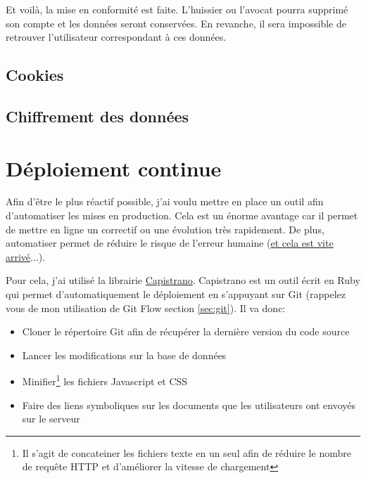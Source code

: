 \documentclass[]{report}
\begin{document}
        Et voilà, la mise en conformité est faite. L'huissier ou l'avocat pourra supprimé son compte et les données seront conservées. En revanche, il sera impossible de retrouver l'utilisateur correspondant à ces données.

    \subsection{Cookies}


    \subsection{Chiffrement des données}


  \section{Déploiement continue}\label{sec:deployments}

    Afin d'être le plus réactif possible, j'ai voulu mettre en place un outil afin d'automatiser les mises en production. Cela est un énorme avantage car il permet de mettre en ligne un correctif ou une évolution très rapidement. De plus, automatiser permet de réduire le risque de l'erreur humaine (\href{https://www.reddit.com/r/webdev/comments/5rd79m/gitlab_employee_just_ran_rm_rf_on_their/}{et cela est vite arrivé}...).

    Pour cela, j'ai utilisé la librairie \href{https://capistranorb.com}{Capistrano}. Capistrano est un outil écrit en Ruby qui permet d'automatiquement le déploiement en s'appuyant sur Git (rappelez vous de mon utilisation de Git Flow section \ref{sec:git}). Il va donc:

    \begin{itemize}
      \item Cloner le répertoire Git afin de récupérer la dernière version du code source
      \item Lancer les modifications sur la base de données
      \item Minifier\footnote{Il s'agit de concateiner les fichiers texte en un seul afin de réduire le nombre de requête HTTP et d'améliorer la vitesse de chargement} les fichiers Javascript et CSS
      \item Faire des liens symboliques sur les documents que les utilisateurs ont envoyés sur le serveur
    \end{itemize}
\end{document}
